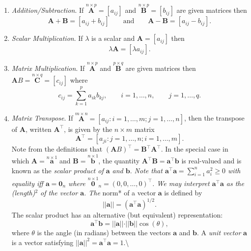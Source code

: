 \documentclass[]{book}
\theoremstyle{definition}
\theoremstyle{definition}
\theoremstyle{definition}
\theoremstyle{remark}
\begin{document}
\begin{enumerate}
\def\labelenumi{\arabic{enumi}.}
\item
  \emph{Addition/Subtraction}. If \(\stackrel{n\times p}{\mathbf A}=[a_{ij}]\) and \(\stackrel{n\times p}{\mathbf B}=[b_{ij}]\) are
  given matrices then
  \[ {\mathbf A}+{\mathbf B}=[a_{ij}+b_{ij}] \qquad \text{and} \qquad {\mathbf A}-{\mathbf B}=[a_{ij}-b_{ij}].\]
\item
  \emph{Scalar Multiplication}. If \(\lambda\) is a scalar and \({\mathbf A}=[a_{ij}]\) then
  \[\lambda {\mathbf A}=[\lambda a_{ij}].\]
\item
  \emph{Matrix Multiplication}. If \(\stackrel{n\times p}{\mathbf A}\) and \(\stackrel{p\times q}{\mathbf B}\) are
  given matrices then \({\mathbf AB}=\stackrel{n\times q}{\mathbf C}=[c_{ij}]\) where
  \[c_{ij}=\sum _{k=1}^p a_{ik}b_{kj}, \qquad i=1,\dots,n, \qquad j=1,\dots ,q.\]
\item
  \emph{Matrix Transpose}. If \(\stackrel{m \times n}{\boldsymbol A}=[a_{ij}: i=1, \ldots , m; j=1, \ldots , n]\), then the transpose of \(\boldsymbol A\), written
  \(\boldsymbol A^\top\), is given by the \(n \times m\) matrix
  \[
  \boldsymbol A^\top =[a_{ji}: j=1, \ldots , n; i=1, \ldots, m].
  \]
  Note from the definitions that \(({\mathbf AB})^\top={\mathbf B}^\top {\mathbf A}^\top\).
  In the special case in which \({\mathbf A}=\stackrel{n\times 1}{\mathbf a}\) and
  \({\mathbf B}=\stackrel{n\times 1}{\mathbf b}\), the quantity \({\mathbf A}^\top {\mathbf B}={\mathbf a}^\top {\mathbf b}\) is real-valued and is
  known as the \emph{scalar product of \(\mathbf a\) and \(\mathbf b.\)\newline 
  Note that \({\mathbf a}^\top {\mathbf a}=\sum _{i=1}^n a_i^2\geq 0\) with equality iff
  \({\mathbf a}={\mathbf 0}_n\) where \(\stackrel{n\times 1}{\mathbf 0}_n=(0,0,\dots ,0)^\top\). We may
  interpret \({\mathbf a}^\top {\mathbf a}\) as the (length)\(^2\) of the vector \({\mathbf a}\).
  The }norm* of a vector \({\mathbf a}\) is defined by
  \[||{\mathbf a}||=({\mathbf a}^\top {\mathbf a})^{1/2}.\]
  The scalar product has an alternative (but equivalent) representation:
  \[
  \boldsymbol a^\top \boldsymbol b= \vert \vert \boldsymbol a\vert \vert \cdot \vert \vert \boldsymbol b\vert \vert \cos(\theta),
  \]
  where \(\theta\) is the angle (in radians) between the vectors \(\boldsymbol a\) and \(\boldsymbol b\).\newline 
  A \emph{unit vector} \(\mathbf a\) is a vector satisfying \(||{\mathbf a}||^2= {\mathbf a}^\top {\mathbf a}=1\).\textbackslash{}

\end{enumerate}
\end{document}
